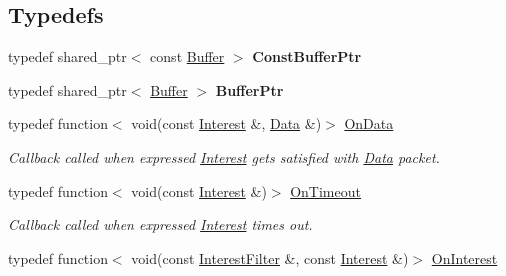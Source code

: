 \subsection*{Typedefs}
\begin{DoxyCompactItemize}
\item 
typedef shared\+\_\+ptr$<$ const \hyperlink{classndn_1_1Buffer}{Buffer} $>$ {\bfseries Const\+Buffer\+Ptr}\hypertarget{namespacendn_aa8ce978240a5883988086b34fe998441}{}\label{namespacendn_aa8ce978240a5883988086b34fe998441}

\item 
typedef shared\+\_\+ptr$<$ \hyperlink{classndn_1_1Buffer}{Buffer} $>$ {\bfseries Buffer\+Ptr}\hypertarget{namespacendn_ac38729e320ba867e310ba170405c25d0}{}\label{namespacendn_ac38729e320ba867e310ba170405c25d0}

\item 
typedef function$<$ void(const \hyperlink{classndn_1_1Interest}{Interest} \&, \hyperlink{classndn_1_1Data}{Data} \&)$>$ \hyperlink{namespacendn_a3594ce6ee9b530d1fd0eb0d59d3587da}{On\+Data}\hypertarget{namespacendn_a3594ce6ee9b530d1fd0eb0d59d3587da}{}\label{namespacendn_a3594ce6ee9b530d1fd0eb0d59d3587da}

\begin{DoxyCompactList}\small\item\em Callback called when expressed \hyperlink{classndn_1_1Interest}{Interest} gets satisfied with \hyperlink{classndn_1_1Data}{Data} packet. \end{DoxyCompactList}\item 
typedef function$<$ void(const \hyperlink{classndn_1_1Interest}{Interest} \&)$>$ \hyperlink{namespacendn_aa4752a1808de5e7246dd6b1151e4e87f}{On\+Timeout}\hypertarget{namespacendn_aa4752a1808de5e7246dd6b1151e4e87f}{}\label{namespacendn_aa4752a1808de5e7246dd6b1151e4e87f}

\begin{DoxyCompactList}\small\item\em Callback called when expressed \hyperlink{classndn_1_1Interest}{Interest} times out. \end{DoxyCompactList}\item 
typedef function$<$ void(const \hyperlink{classndn_1_1InterestFilter}{Interest\+Filter} \&, const \hyperlink{classndn_1_1Interest}{Interest} \&)$>$ \hyperlink{namespacendn_a6ddca075866d76508a3dd3b15533cac2}{On\+Interest}\hypertarget{namespacendn_a6ddca075866d76508a3dd3b15533cac2}{}\label{namespacendn_a6ddca075866d76508a3dd3b15533cac2}


\end{DoxyCompactItemize}
